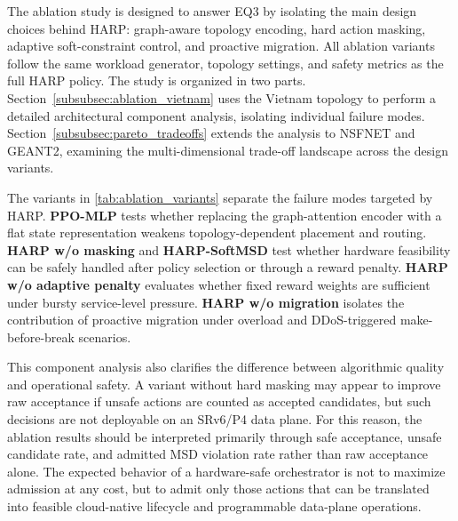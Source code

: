 \documentclass[final,5p]{elsarticle}
\begin{document}
The ablation study is designed to answer EQ3 by isolating the main design choices behind HARP: graph-aware topology encoding, hard action masking, adaptive soft-constraint control, and proactive migration. All ablation variants follow the same workload generator, topology settings, and safety metrics as the full HARP policy. The study is organized in two parts. Section~\ref{subsubsec:ablation_vietnam} uses the Vietnam topology to perform a detailed architectural component analysis, isolating individual failure modes. Section~\ref{subsubsec:pareto_tradeoffs} extends the analysis to NSFNET and GEANT2, examining the multi-dimensional trade-off landscape across the design variants.

The variants in \autoref{tab:ablation_variants} separate the failure modes targeted by HARP. \textbf{PPO-MLP} tests whether replacing the graph-attention encoder with a flat state representation weakens topology-dependent placement and routing. \textbf{HARP w/o masking} and \textbf{HARP-SoftMSD} test whether hardware feasibility can be safely handled after policy selection or through a reward penalty. \textbf{HARP w/o adaptive penalty} evaluates whether fixed reward weights are sufficient under bursty service-level pressure. \textbf{HARP w/o migration} isolates the contribution of proactive migration under overload and DDoS-triggered make-before-break scenarios.

This component analysis also clarifies the difference between algorithmic quality and operational safety. A variant without hard masking may appear to improve raw acceptance if unsafe actions are counted as accepted candidates, but such decisions are not deployable on an SRv6/P4 data plane. For this reason, the ablation results should be interpreted primarily through safe acceptance, unsafe candidate rate, and admitted MSD violation rate rather than raw acceptance alone. The expected behavior of a hardware-safe orchestrator is not to maximize admission at any cost, but to admit only those actions that can be translated into feasible cloud-native lifecycle and programmable data-plane operations.
\end{document}
